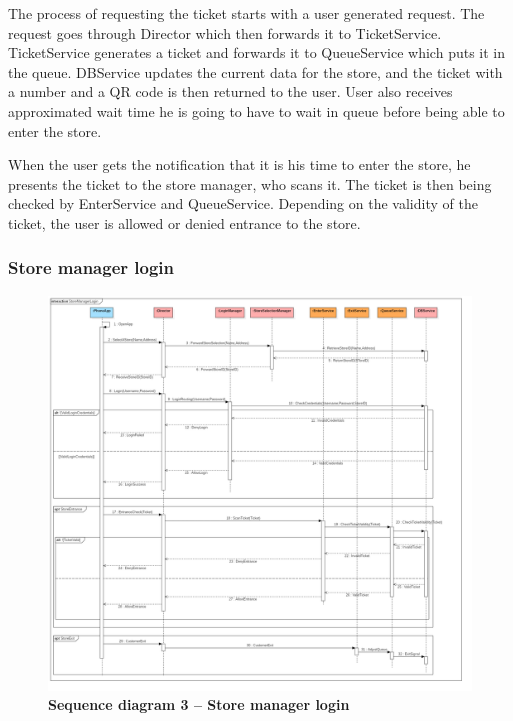   

The process of requesting the ticket starts with a user generated request. The request goes through Director which then forwards it to TicketService. TicketService generates a ticket and forwards it to QueueService which puts it in the queue. DBService updates the current data for the store, and the ticket with a number and a QR code is then returned to the user.  User also receives approximated wait time he is going to have to wait in queue before being able to enter the store. 

  

When the user gets the notification that it is his time to enter the store, he presents the ticket to the store manager, who scans it. The ticket is then being checked by EnterService and QueueService. Depending on the validity of the ticket, the user is allowed or denied entrance to the store.   


\subsubsection{Store manager login}


\begin{figure}[!h]
\centering
\includegraphics[width=\textwidth]{Images/SequenceDiagramComponents3_StoreManager}
\caption{\label{fig:seqdiagram3}\textbf{Sequence diagram 3 – Store manager login}}
\end{figure}
\newpage

